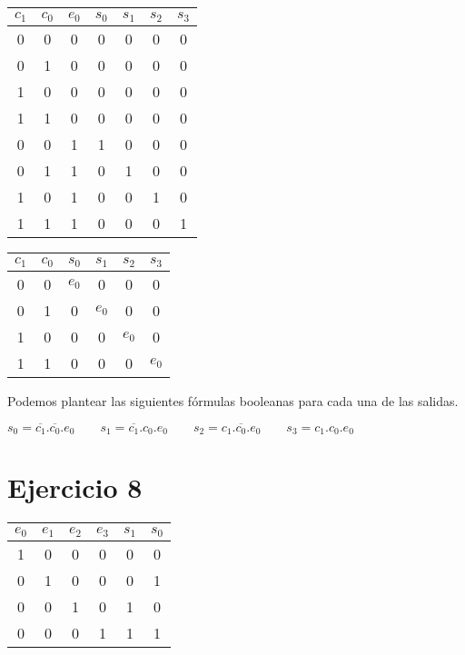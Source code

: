 \begin{multicols}{2}
    \begin{tabular}{|c|c|c||c|c|c|c|}
        $c_1$ & $c_0$ & $e_0$ & $s_0$ & $s_1$ & $s_2$ & $s_3$ \\
        \hline
        0 & 0 & 0 & 0 & 0 & 0 & 0 \\
        0 & 1 & 0 & 0 & 0 & 0 & 0 \\
        1 & 0 & 0 & 0 & 0 & 0 & 0 \\
        1 & 1 & 0 & 0 & 0 & 0 & 0 \\
        0 & 0 & 1 & 1 & 0 & 0 & 0 \\
        0 & 1 & 1 & 0 & 1 & 0 & 0 \\
        1 & 0 & 1 & 0 & 0 & 1 & 0 \\
        1 & 1 & 1 & 0 & 0 & 0 & 1 \\
    \end{tabular}

    \begin{tabular}{|c|c||c|c|c|c|}
        $c_1$ & $c_0$ & $s_0$ & $s_1$ & $s_2$ & $s_3$ \\
        \hline
        0 & 0 & $e_0$ & 0 & 0 & 0 \\
        0 & 1 & 0 & $e_0$ & 0 & 0 \\
        1 & 0 & 0 & 0 & $e_0$ & 0 \\
        1 & 1 & 0 & 0 & 0 & $e_0$ \\
    \end{tabular}
\end{multicols}

Podemos plantear las siguientes fórmulas booleanas para cada una de las salidas.

$
s_0 = \overline{c_1}.\overline{c_0}.e_0
\hspace{2em}
s_1 = \overline{c_1}.c_0.e_0
\hspace{2em}
s_2 = c_1.\overline{c_0}.e_0
\hspace{2em}
s_3 = c_1.c_0.e_0
$

\begin{figure}[ht]
    
\end{figure}

\pagebreak

\section{Ejercicio 8}

\begin{tabular}{|c|c|c|c||c|c|}
    $e_0$ & $e_1$ & $e_2$ & $e_3$ & $s_1$ & $s_0$ \\
    \hline
    1 & 0 & 0 & 0 & 0 & 0 \\
    0 & 1 & 0 & 0 & 0 & 1 \\
    0 & 0 & 1 & 0 & 1 & 0 \\
    0 & 0 & 0 & 1 & 1 & 1 \\
\end{tabular}

